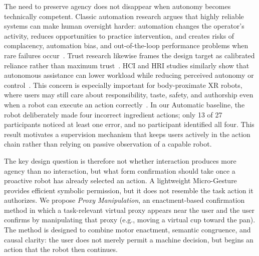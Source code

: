 \documentclass[sigconf,review,anonymous]{acmart}
\begin{document}
The need to preserve agency does not disappear when autonomy becomes technically competent. Classic automation research argues that highly reliable systems can make human oversight harder: automation changes the operator's activity, reduces opportunities to practice intervention, and creates risks of complacency, automation bias, and out-of-the-loop performance problems when rare failures occur~\cite{bainbridge1983ironies, endsley1995outofloop, parasuraman2000model, parasuraman2010complacency}. Trust research likewise frames the design target as calibrated reliance rather than maximum trust~\cite{lee2004trust, hancock2011trusthri}. HCI and HRI studies similarly show that autonomous assistance can lower workload while reducing perceived autonomy or control~\cite{10.1145/3706598.3713765, 10.5555/3721488.3721596, 10.1145/2702123.2702379, 10.1145/3319502.3374818}. This concern is especially important for body-proximate XR robots, where users may still care about responsibility, taste, safety, and authorship even when a robot can execute an action correctly~\cite{jorling2019service, 10.1145/3746058.3762829, 10.1145/3491102.3517449}. In our Automatic baseline, the robot deliberately made four incorrect ingredient actions; only 13 of 27 participants noticed at least one error, and no participant identified all four. This result motivates a supervision mechanism that keeps users actively in the action chain rather than relying on passive observation of a capable robot.

The key design question is therefore not whether interaction produces more agency than no interaction, but what form confirmation should take once a proactive robot has already selected an action. A lightweight Micro-Gesture provides efficient symbolic permission, but it does not resemble the task action it authorizes. We propose \textit{Proxy Manipulation}, an enactment-based confirmation method in which a task-relevant virtual proxy appears near the user and the user confirms by manipulating that proxy (e.g., moving a virtual cup toward the pan). The method is designed to combine motor enactment, semantic congruence, and causal clarity: the user does not merely permit a machine decision, but begins an action that the robot then continues.
\end{document}
